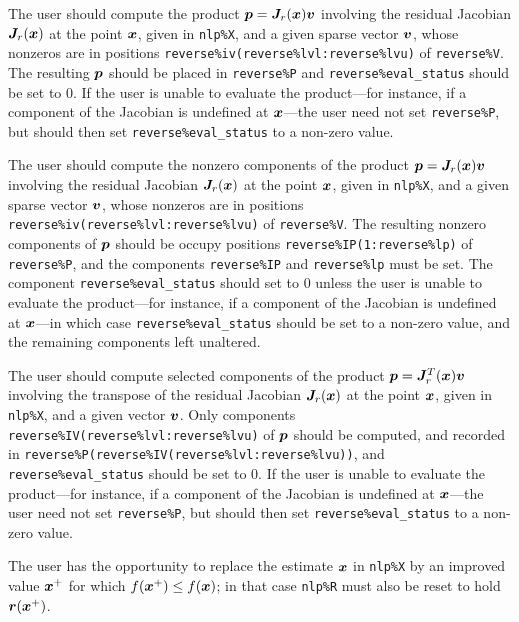 \documentclass{galahad}
\begin{document}
\begin{description}
 The user should compute the product ${\bm{p}} = {\bm{J}}_r({\bm{x}}) {\bm{v}}$
     involving the residual Jacobian ${\bm{J}}_r({\bm{x}})$ at the point ${\bm{x}}$, given
     in {\tt nlp\%X}, and a given sparse vector ${\bm{v}}$, whose nonzeros
     are in positions {\tt reverse\%iv(reverse\%lvl:reverse\%lvu)}
     of {\tt reverse\%V}. The resulting ${\bm{p}}$ should be placed in 
     {\tt reverse\%P} and {\tt reverse\%eval\_status} should be set to 0. 
     If the user is unable to evaluate the product---for instance, if a 
     component of the Jacobian is undefined at ${\bm{x}}$---the user need not 
     set {\tt reverse\%P}, but should then set {\tt reverse\%eval\_status} 
     to a non-zero value.

 The user should compute the nonzero components of the product 
     ${\bm{p}} = {\bm{J}}_r({\bm{x}}) {\bm{v}}$
     involving the residual Jacobian ${\bm{J}}_r({\bm{x}})$ at the point ${\bm{x}}$, given
     in {\tt nlp\%X}, and a given sparse vector ${\bm{v}}$, whose nonzeros
     are in positions {\tt reverse\%iv(\-reverse\%lvl:reverse\%lvu)}
     of {\tt reverse\%V}. The resulting nonzero components of ${\bm{p}}$ should be 
     occupy positions {\tt reverse\%IP(1:reverse\%lp)} of {\tt reverse\%P},
     and the components {\tt reverse\%IP} and {\tt reverse\%lp} must be set.
     The component {\tt reverse\%eval\_status} should set to 0 unless the
     user is unable to evaluate the product---for instance, if a component of 
     the Jacobian is undefined at ${\bm{x}}$---in which case 
     {\tt reverse\%eval\_status} should be set to a non-zero value, and the
     remaining components left unaltered.

 The user should compute selected components of the product 
     ${\bm{p}} = {\bm{J}}_r^T({\bm{x}}) {\bm{v}}$ involving the transpose of the residual 
     Jacobian ${\bm{J}}_r({\bm{x}})$ at the point ${\bm{x}}$, given
     in {\tt nlp\%X}, and a given vector ${\bm{v}}$. Only components \linebreak
     {\tt reverse\%IV(reverse\%lvl:reverse\%lvu)} of ${\bm{p}}$ should
     be computed, and recorded in \linebreak
     {\tt reverse\%P(reverse\%IV(reverse\%lvl:reverse\%lvu))}, and
     {\tt reverse\%eval\_status} should be set to 0. 
     If the user is unable to evaluate the product---for instance, if a 
     component of the Jacobian is undefined at ${\bm{x}}$---the user need not 
     set {\tt reverse\%P}, but should then set {\tt reverse\%eval\_status} 
     to a non-zero value.

 The user has the opportunity to replace the estimate ${\bm{x}}$ in 
     {\tt nlp\%X} by an improved value ${\bm{x}}^+$ for which 
     $f({\bm{x}}^+) \leq f({\bm{x}})$; in that case {\tt nlp\%R} must also be reset to
     hold ${\bm{r}}({\bm{x}}^+)$.

\end{description}
\end{document}
